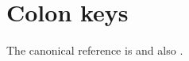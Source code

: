 \section{Colon keys}

The canonical reference is \citet{Bertsekas:2000:DPO:517430} and also
\citep{Sutton:2018:RLI}.
